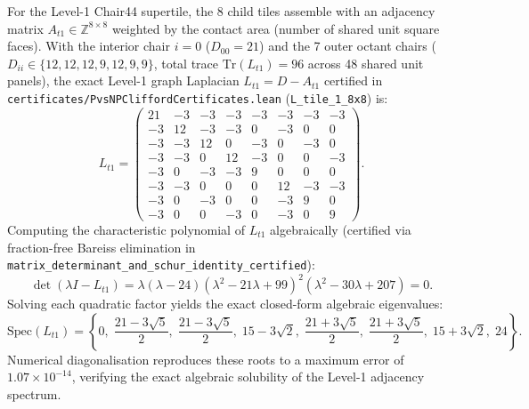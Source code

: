\documentclass[11pt,a4paper]{article}
\theoremstyle{definition}
\newcommand{\Z}{\mathbb{Z}}
\newcommand{\Tr}{\mathrm{Tr}}
\begin{document}
For the Level-1 Chair44 supertile, the 8 child tiles assemble with an adjacency matrix $A_{t1} \in \Z^{8 \times 8}$ weighted by the contact area (number of shared unit square faces). With the interior chair $i=0$ ($D_{00} = 21$) and the 7 outer octant chairs ($D_{ii} \in \{12, 12, 12, 9, 12, 9, 9\}$, total trace $\Tr(L_{t1}) = 96$ across 48 shared unit panels), the exact Level-1 graph Laplacian $L_{t1} = D - A_{t1}$ certified in \texttt{certificates/PvsNPCliffordCertificates.lean} (\texttt{L\_tile\_1\_8x8}) is:
\begin{equation}
\label{eq:Lt1_matrix}
L_{t1} = \begin{pmatrix}
21 & -3 & -3 & -3 & -3 & -3 & -3 & -3 \\
-3 & 12 & -3 & -3 &  0 & -3 &  0 &  0 \\
-3 & -3 & 12 &  0 & -3 &  0 & -3 &  0 \\
-3 & -3 &  0 & 12 & -3 &  0 &  0 & -3 \\
-3 &  0 & -3 & -3 &  9 &  0 &  0 &  0 \\
-3 & -3 &  0 &  0 &  0 & 12 & -3 & -3 \\
-3 &  0 & -3 &  0 &  0 & -3 &  9 &  0 \\
-3 &  0 &  0 & -3 &  0 & -3 &  0 &  9
\end{pmatrix}.
\end{equation}
Computing the characteristic polynomial of $L_{t1}$ algebraically (certified via fraction-free Bareiss elimination in \texttt{matrix\_determinant\_and\_schur\_identity\_certified}):
\begin{equation}
\det(\lambda I - L_{t1}) = \lambda (\lambda - 24) (\lambda^2 - 21\lambda + 99)^2 (\lambda^2 - 30\lambda + 207) = 0.
\end{equation}
Solving each quadratic factor yields the exact closed-form algebraic eigenvalues:
\begin{equation}
\label{eq:exact_eigs}
\mathrm{Spec}(L_{t1}) = \left\{0, \; \frac{21 - 3\sqrt{5}}{2}, \; \frac{21 - 3\sqrt{5}}{2}, \; 15 - 3\sqrt{2}, \; \frac{21 + 3\sqrt{5}}{2}, \; \frac{21 + 3\sqrt{5}}{2}, \; 15 + 3\sqrt{2}, \; 24\right\}.
\end{equation}
Numerical diagonalisation reproduces these roots to a maximum error of $1.07 \times 10^{-14}$, verifying the exact algebraic solubility of the Level-1 adjacency spectrum.
\end{document}
